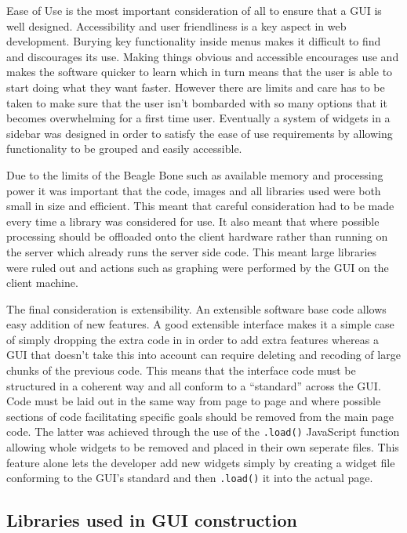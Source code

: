 	Ease of Use is the most important consideration of all to ensure that a GUI is well designed.  Accessibility and user friendliness is a key aspect in web development.  Burying key functionality inside menus makes it difficult to find and discourages its use.   Making things obvious and accessible encourages use and makes the software quicker to learn which in turn means that the user is able to start doing what they want faster.  However there are limits and care has to be taken to make sure that the user isn't bombarded with so many options that it becomes overwhelming for a first time user.  Eventually a system of widgets in a sidebar was designed in order to satisfy the ease of use requirements by allowing functionality to be grouped and easily accessible.

	Due to the limits of the Beagle Bone such as available memory and processing power it was important that the code, images and all libraries used were both small in size and efficient.  This meant that careful consideration had to be made every time a library was considered for use.  It also meant that where possible processing should be offloaded onto the client hardware rather than running on the server which already runs the server side code.  This meant large libraries were ruled out and actions such as graphing were performed by the GUI on the client machine.

	The final consideration is extensibility.  An extensible software base code allows easy addition of new features.  A good extensible interface makes it a simple case of simply dropping the extra code in in order to add extra features whereas a GUI that doesn't take this into account can require deleting and recoding of large chunks of the previous code.  This means that the interface code must be structured in a coherent way and all conform to a ``standard'' across the GUI.  Code must be laid out in the same way from page to page and where possible sections of code facilitating specific goals should be removed from the main page code.  The latter was achieved through the use of the \verb/.load()/ JavaScript function allowing whole widgets to be removed and placed in their own seperate files.  This feature alone lets the developer add new widgets simply by creating a widget file conforming to the GUI's standard and then \verb/.load()/ it into the actual page.

\subsection{Libraries used in GUI construction}

